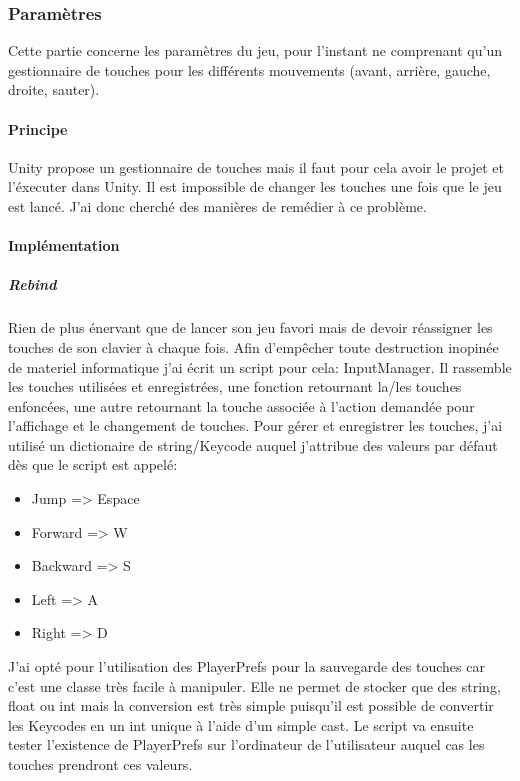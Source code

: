 \documentclass{article}
\begin{document}
\subsubsection{Paramètres}
Cette partie concerne les paramètres du jeu, pour l'instant ne comprenant qu'un gestionnaire de touches pour les différents mouvements (avant, arrière, gauche, droite, sauter).

\paragraph{Principe}
Unity propose un gestionnaire de touches mais il faut pour cela avoir le projet et l'éxecuter dans Unity.
Il est impossible de changer les touches une fois que le jeu est lancé. J'ai donc cherché des manières de remédier à ce problème.

\paragraph{Implémentation}

\subparagraph{Rebind}
Rien de plus énervant que de lancer son jeu favori mais de devoir réassigner les touches de son clavier à chaque fois. Afin d'empêcher toute destruction inopinée de materiel informatique j'ai écrit un script pour cela: InputManager. Il rassemble les touches utilisées et enregistrées, une fonction retournant la/les touches enfoncées, une autre retournant la touche associée à l'action demandée pour l'affichage et le changement de touches.
\newline Pour gérer et enregistrer les touches, j'ai utilisé un dictionaire de string/Keycode auquel j'attribue des valeurs par défaut dès que le script est appelé:

\begin{itemize}
    \item Jump => Espace
    \item Forward => W
    \item Backward => S
    \item Left => A
    \item Right => D
\end{itemize}

J'ai opté pour l'utilisation des PlayerPrefs pour la sauvegarde des touches car c'est une classe très facile à manipuler. Elle ne permet de stocker que des string, float ou int mais la conversion est très simple puisqu'il est possible de convertir les Keycodes en un int unique à l'aide d'un simple cast.
\newline Le script va ensuite tester l'existence de PlayerPrefs sur l'ordinateur de l'utilisateur auquel cas les touches prendront ces valeurs.
\end{document}
